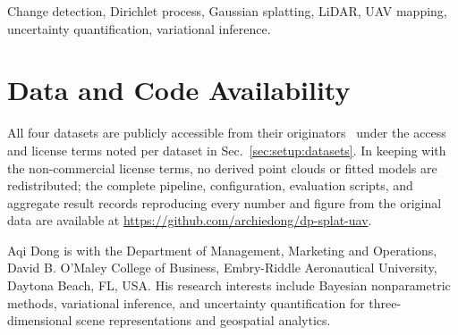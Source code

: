 \documentclass[journal]{IEEEtran}
\begin{document}
\begin{IEEEkeywords}
Change detection, Dirichlet process, Gaussian splatting, LiDAR, UAV
mapping, uncertainty quantification, variational inference.
\end{IEEEkeywords}

\IEEEpeerreviewmaketitle









\section*{Data and Code Availability}
 All four datasets are publicly accessible from their
originators~\cite{koelle2021h3d,turki2022meganerf,chen2022stpls3d,xiong2024gauuscene}
under the access and license terms noted per dataset in
Sec.~\ref{sec:setup:datasets}. In keeping with
the non-commercial license terms, no derived point clouds or
fitted models are redistributed; the complete pipeline, configuration,
evaluation scripts, and aggregate result records reproducing every
number and figure from the original data are available at
\url{https://github.com/archiedong/dp-splat-uav}.




\begin{IEEEbiographynophoto}{Aqi Dong}
is with the Department of Management, Marketing and Operations, David B.
O'Maley College of Business, Embry-Riddle Aeronautical University, Daytona
Beach, FL, USA. His research interests include Bayesian nonparametric
methods, variational inference, and uncertainty quantification for
three-dimensional scene representations and geospatial analytics.
\end{IEEEbiographynophoto}
\end{document}

